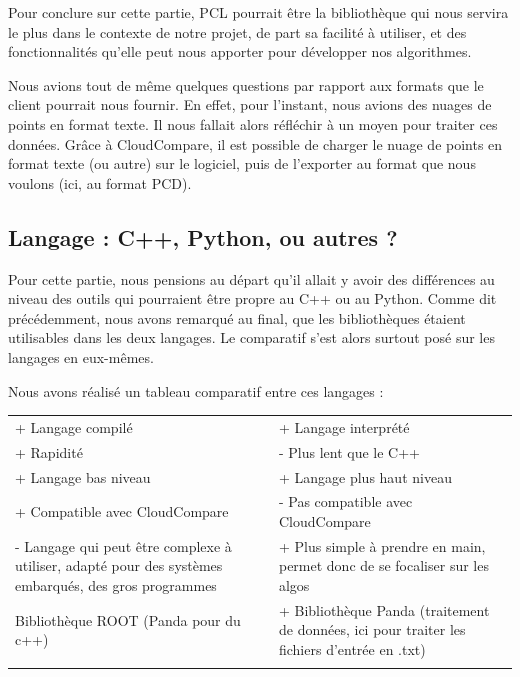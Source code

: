 \documentclass[12pt,titlepage,french]{article}
\begin{document}
Pour conclure sur cette partie, PCL pourrait être la bibliothèque qui nous servira le plus dans le contexte de notre projet, de part sa facilité à utiliser, et des fonctionnalités qu'elle peut nous apporter pour développer nos algorithmes.

Nous avions tout de même quelques questions par rapport aux formats que le client pourrait nous fournir. En effet, pour l'instant, nous avions des nuages de points en format texte. Il nous fallait alors réfléchir à un moyen pour traiter ces données. Grâce à CloudCompare, il est possible de charger le nuage de points en format texte (ou autre) sur le logiciel, puis de l'exporter au format que nous voulons (ici, au format PCD).

\subsection{Langage : C++, Python, ou autres ?}

Pour cette partie, nous pensions au départ qu'il allait y avoir des différences au niveau des outils qui pourraient être propre au C++ ou au Python. Comme dit précédemment, nous avons remarqué au final, que les bibliothèques étaient utilisables dans les deux langages. Le comparatif s'est alors surtout posé sur les langages en eux-mêmes.

Nous avons réalisé un tableau comparatif entre ces langages : \\

\noindent\begin{tabu} to \textwidth {X[c]X[c]}\toprule
  &\\\toprule
+ Langage compilé
& + Langage interprété\\\midrule
+ Rapidité
& - Plus lent que le C++\\\midrule
+ Langage bas niveau
& + Langage plus haut niveau\\\midrule
+ Compatible avec CloudCompare
& - Pas compatible avec CloudCompare\\\midrule
- Langage qui peut être complexe à utiliser, adapté pour des systèmes embarqués, des gros programmes
& + Plus simple à prendre en main, permet donc de se focaliser sur les algos\\\midrule
 Bibliothèque ROOT (Panda pour du c++)
& + Bibliothèque Panda (traitement de données, ici pour traiter les fichiers d'entrée en .txt)\\\bottomrule  \\
\end{tabu}
\end{document}
